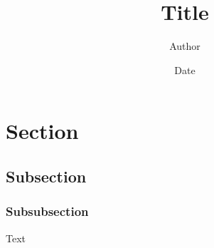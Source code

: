 \documentclass{article}
\title{Title}
\author{Author}
\date{Date}
\begin{document}
\maketitle

\section{Section}
\subsection{Subsection}
\subsubsection{Subsubsection}
Text
\end{document}
